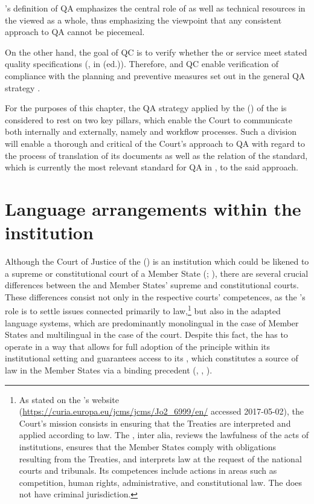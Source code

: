 \documentclass[output=paper]{langsci/langscibook}
\begin{document}
\citeauthor{Popiołek2015}’s definition of QA emphasizes the central role of  as well as technical resources in the  viewed as a whole, thus emphasizing the viewpoint that any consistent approach to QA cannot be piecemeal.

On the other hand, the goal of QC is to verify whether the  or service meet stated quality specifications (\citealt[169]{Lušicky2017}, in \citealt{Lommel2015} (ed.)). Therefore,  and QC enable verification of compliance with the planning and preventive measures set out in the general QA strategy \citep[169]{Lušicky2017}.

For the purposes of this chapter, the QA strategy applied by the  () of the  is considered to rest on two key pillars, which enable the Court to communicate both internally and externally, namely  and workflow processes. Such a division will enable a thorough and critical  of the Court’s approach to QA with regard to the process of translation of its documents as well as the relation of the \citeauthor{ISO2015}  standard, which is currently the most relevant standard for QA in , to the said approach.

\section{Language arrangements within the institution}\label{sec:kozbial:2}

Although the Court of Justice of the  () is an  institution which could be likened to a supreme or constitutional court of a Member State (\citealt[10]{Roper2011}; \citealt{Itzcovich2014}), there are several crucial differences between the  and Member States’ supreme and constitutional courts. These differences consist not only in the respective courts’ competences, as the ’s role is to settle issues connected primarily to  law,\footnote{As stated on the ’s website (\url{https://curia.europa.eu/jcms/jcms/Jo2_6999/en/} accessed 2017-05-02), the Court’s mission consists in ensuring that the Treaties are interpreted and applied according to  law. The , inter alia, reviews the lawfulness of the acts of  institutions, ensures that the Member States comply with obligations resulting from the Treaties, and interprets  law at the request of the national courts and tribunals. Its competences include actions in areas such as competition, human rights, administrative, and constitutional law. The  does not have criminal jurisdiction.} but also in the adapted language systems, which are predominantly monolingual in the case of Member States and multilingual in the case of the  court. Despite this fact, the  has to operate in a way that allows for full adoption of the  principle within its institutional setting and guarantees access to its , which constitutes a source of law in the Member States via a binding precedent (\citealt[86]{Łachacz2013},  \citealt[626–628]{Arnull2006}, \citealt[221–232]{Sulikowski2005}).
\end{document}
